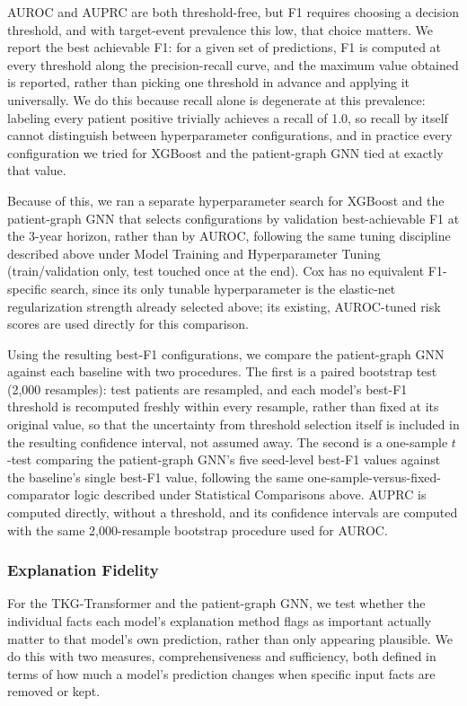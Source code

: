 AUROC and AUPRC are both threshold-free, but F1 requires choosing a decision threshold, and with target-event prevalence this low, that choice matters. We report the best achievable F1: for a given set of predictions, F1 is computed at every threshold along the precision-recall curve, and the maximum value obtained is reported, rather than picking one threshold in advance and applying it universally. We do this because recall alone is degenerate at this prevalence: labeling every patient positive trivially achieves a recall of 1.0, so recall by itself cannot distinguish between hyperparameter configurations, and in practice every configuration we tried for XGBoost and the patient-graph GNN tied at exactly that value.

Because of this, we ran a separate hyperparameter search for XGBoost and the patient-graph GNN that selects configurations by validation best-achievable F1 at the 3-year horizon, rather than by AUROC, following the same tuning discipline described above under Model Training and Hyperparameter Tuning (train/validation only, test touched once at the end). Cox has no equivalent F1-specific search, since its only tunable hyperparameter is the elastic-net regularization strength already selected above; its existing, AUROC-tuned risk scores are used directly for this comparison.

Using the resulting best-F1 configurations, we compare the patient-graph GNN against each baseline with two procedures. The first is a paired bootstrap test (2{,}000 resamples): test patients are resampled, and each model's best-F1 threshold is recomputed freshly within every resample, rather than fixed at its original value, so that the uncertainty from threshold selection itself is included in the resulting confidence interval, not assumed away. The second is a one-sample $t$-test comparing the patient-graph GNN's five seed-level best-F1 values against the baseline's single best-F1 value, following the same one-sample-versus-fixed-comparator logic described under Statistical Comparisons above. AUPRC is computed directly, without a threshold, and its confidence intervals are computed with the same 2{,}000-resample bootstrap procedure used for AUROC.

\subsubsection{Explanation Fidelity}
\label{sec:fidelity}

For the TKG-Transformer and the patient-graph GNN, we test whether the individual facts each model's explanation method flags as important actually matter to that model's own prediction, rather than only appearing plausible. We do this with two measures, comprehensiveness and sufficiency, both defined in terms of how much a model's prediction changes when specific input facts are removed or kept.

